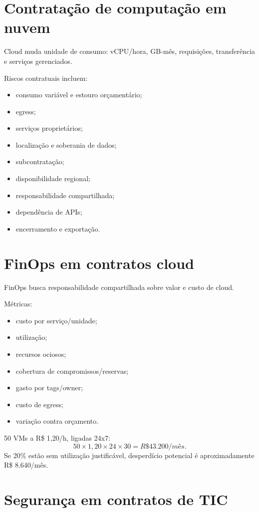 \section{Contratação de computação em nuvem}

Cloud muda unidade de consumo: vCPU/hora, GB-mês, requisições, transferência e serviços gerenciados.

Riscos contratuais incluem:
\begin{itemize}
\item consumo variável e estouro orçamentário;
\item egress;
\item serviços proprietários;
\item localização e soberania de dados;
\item subcontratação;
\item disponibilidade regional;
\item responsabilidade compartilhada;
\item dependência de APIs;
\item encerramento e exportação.
\end{itemize}

\section{FinOps em contratos cloud}

FinOps busca responsabilidade compartilhada sobre valor e custo de cloud.

Métricas:
\begin{itemize}
\item custo por serviço/unidade;
\item utilização;
\item recursos ociosos;
\item cobertura de compromissos/reservas;
\item gasto por tags/owner;
\item custo de egress;
\item variação contra orçamento.
\end{itemize}

\begin{exemplo}
50 VMs a R\$ 1,20/h, ligadas 24x7:
\[
50\times1{,}20\times24\times30=R\$43.200/mês.
\]
Se 20\% estão sem utilização justificável, desperdício potencial é aproximadamente R\$ 8.640/mês.
\end{exemplo}

\section{Segurança em contratos de TIC}

